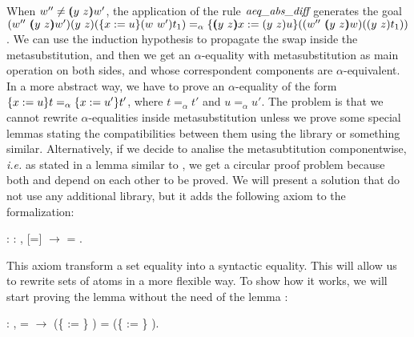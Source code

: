 \begin{coqdoccode}
\end{coqdoccode}
When $w'' \neq \vswap{y}{z}{w'}$, the application of the rule $\mbox{\it aeq}\_\mbox{\it abs}\_\mbox{\it diff}$ generates the goal $\swap{w''}{\vswap{y}{z}{w'}}{\swap{y}{z}{(\metasub{\swap{w}{w'}{t_1}}{x}{u})}} =_\alpha \metasub{(\swap{w''}{\vswap{y}{z}{w}}{(\swap{y}{z}{t_1})})}{\vswap{y}{z}{x}}{\swap{y}{z}{u}}$. We can use the induction hypothesis to propagate the swap inside the metasubstitution, and then we get an $\alpha$-equality with metasubstitution as main operation on both sides, and whose correspondent components are $\alpha$-equivalent. In a more abstract way, we have to prove an $\alpha$-equality of the form $\metasub{t}{x}{u} =_\alpha \metasub{t'}{x}{u'}$, where $t =_\alpha t'$ and $u =_\alpha u'$. The problem is that we cannot rewrite $\alpha$-equalities inside metasubstitution unless we prove some special lemmas stating the compatibilities between them using the  library or something similar. Alternatively, if we decide to analise the metasubtitution componentwise, {\it i.e.} as stated in a lemma similar to , we get a circular proof problem because both  and  depend on each other to be proved. We will present a solution that do not use any additional library, but it adds the following axiom to the formalization:
\begin{coqdoccode}
\coqdocemptyline
\coqdocnoindent
{} : \coqdockw{\ensuremath{\forall}}  : ,  [=]  \ensuremath{\rightarrow}  = .\coqdoceol
\coqdocemptyline
\end{coqdoccode}
This axiom transform a set equality into a syntactic equality. This will allow us to rewrite sets of atoms in a more flexible way. To show how it works, we will start proving the lemma  without the need of the lemma :
\begin{coqdoccode}
\coqdocemptyline
\coqdocnoindent
{} : \coqdockw{\ensuremath{\forall}}    ,  =  \ensuremath{\rightarrow} (\{ := \} ) = (\{ := \} ).\coqdoceol
\end{coqdoccode}
